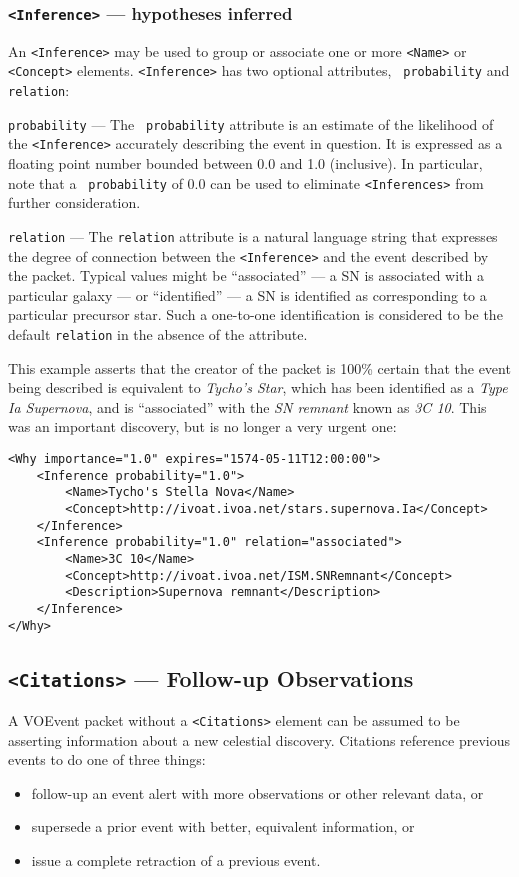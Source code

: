 \documentclass[11pt,a4paper]{ivoa}
\begin{document}
\subsubsection{\texttt{<Inference>} --- hypotheses inferred}\label{sec:3.6.6}
An \texttt{<Inference>} may be used to group or associate one or more \texttt{<Name>} 
or \texttt{<Concept>} elements. \texttt{<Inference>} has two optional attributes, {\tt
probability} and \texttt{relation}: 

 \texttt{probability}\label{sec:3.6.6.1} --- The \texttt{
probability} attribute is an estimate of the likelihood of the \texttt{<Inference>}
accurately describing the event in question. It is expressed as a floating point
number bounded between 0.0 and 1.0 (inclusive). In particular, note that a {\tt
probability} of 0.0 can be used to eliminate \texttt{<Inferences>} from further 
consideration. 

 \texttt{relation}\label{sec:3.6.6.2} --- The \texttt{relation}
attribute is a natural language string that expresses the degree of connection 
between the \texttt{<Inference>} and the event described by the packet. Typical 
values might be ``associated'' --- a SN is associated with a particular galaxy 
--- or ``identified'' --- a SN is identified as corresponding to a particular 
precursor star. Such a one-to-one identification is considered to be the default
\texttt{relation} in the absence of the attribute. 

This example asserts that the creator of the packet is 100\% certain that the
event being described is equivalent to \emph{Tycho's Star}, which has been
identified as a \emph{Type Ia Supernova}, and is ``associated'' with the
\emph{SN remnant} known as \emph{3C 10}. This was an important discovery, but
is no longer a very urgent one:
\begin{lstlisting}
<Why importance="1.0" expires="1574-05-11T12:00:00">
    <Inference probability="1.0">
        <Name>Tycho's Stella Nova</Name>
        <Concept>http://ivoat.ivoa.net/stars.supernova.Ia</Concept>
    </Inference>
    <Inference probability="1.0" relation="associated">
        <Name>3C 10</Name>
        <Concept>http://ivoat.ivoa.net/ISM.SNRemnant</Concept>
        <Description>Supernova remnant</Description>
    </Inference>
</Why>
\end{lstlisting}

\subsection{\texttt{<Citations>} --- Follow-up Observations}
\label{sec:3.7}
A VOEvent packet without a \texttt{<Citations>} element can be assumed to be 
asserting information about a new celestial discovery. Citations reference 
previous events to do one of three things: 
\begin{itemize}
\item follow-up an event alert with more observations or other relevant data, or
\item supersede a prior event with better, equivalent information, or
\item issue a complete retraction of a previous event.
\end{itemize}
\end{document}
